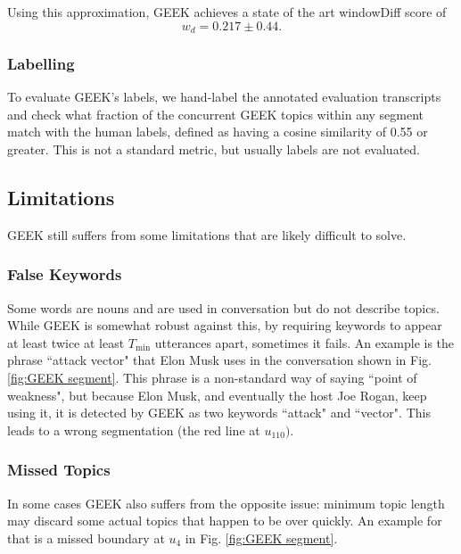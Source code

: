         Using this approximation, GEEK achieves a state of the art windowDiff score of
        \begin{equation}
            w_d = 0.217 \pm 0.44.
        \end{equation}
    
    
    \subsubsection{Labelling}
        To evaluate GEEK's labels, we hand-label the annotated evaluation transcripts and check what fraction of the concurrent GEEK topics within any segment match with the human labels, defined as having a cosine similarity of 0.55 or greater. This is not a standard metric, but usually labels are not evaluated.
    
    \subsection{Limitations}
    GEEK still suffers from some limitations that are likely difficult to solve.
    
    \subsubsection{False Keywords}
        Some words are nouns and are used in conversation but do not describe topics. While GEEK is somewhat robust against this, by requiring keywords to appear at least twice at least $T_{\text{min}}$ utterances apart, sometimes it fails. An example is the phrase ``attack vector" that Elon Musk uses in the conversation shown in Fig. \ref{fig:GEEK segment}. This phrase is a non-standard way of saying ``point of weakness", but because Elon Musk, and eventually the host Joe Rogan, keep using it, it is detected by GEEK as two keywords ``attack" and ``vector". This leads to a wrong segmentation (the red line at $u_{110})$.
    
    \subsubsection{Missed Topics}
        In some cases GEEK also suffers from the opposite issue: minimum topic length may discard some actual topics that happen to be over quickly. An example for that is a missed boundary at $u_4$ in Fig. \ref{fig:GEEK segment}.
        
